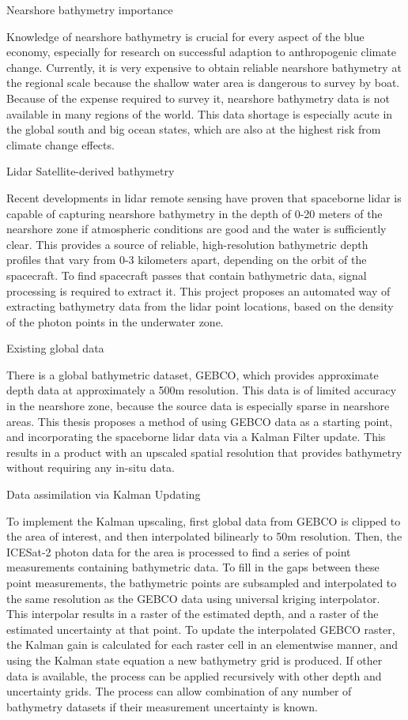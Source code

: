 Nearshore bathymetry importance

Knowledge of nearshore bathymetry is crucial for every aspect of the blue economy, especially for research on successful adaption to anthropogenic climate change. Currently, it is very expensive to obtain reliable nearshore bathymetry at the regional scale because the shallow water area is dangerous to survey by boat. Because of the expense required to survey it, nearshore bathymetry data is not available  in many regions of the world. This data shortage is especially acute in the global south and big ocean states, which are also at the highest risk from climate change effects. 

Lidar Satellite-derived bathymetry

Recent developments in lidar remote sensing have proven that spaceborne lidar is capable of capturing nearshore bathymetry in the depth of 0-20 meters of the nearshore zone if  atmospheric conditions are good and the water is sufficiently clear. This provides a source of reliable, high-resolution bathymetric depth profiles that vary from 0-3 kilometers apart, depending on the orbit of the spacecraft. To find spacecraft passes that contain bathymetric data, signal processing is required to extract it. This project proposes an automated way of extracting bathymetry data from the lidar point locations, based on the density of the photon points in the underwater zone.

Existing global data

There is a global bathymetric dataset, GEBCO, which provides approximate depth data at approximately a 500m resolution. This data is of limited accuracy in the nearshore zone, because the source data is especially sparse in nearshore areas. This thesis proposes a method of using GEBCO data as a starting point, and incorporating the spaceborne lidar data via a Kalman Filter update. This results in a product with an upscaled spatial resolution that provides bathymetry without requiring any in-situ data.

Data assimilation via Kalman Updating

To implement the Kalman upscaling, first global data from GEBCO is clipped to the area of interest, and then interpolated bilinearly to 50m resolution. Then, the ICESat-2 photon data for the area is processed to find a series of point measurements containing bathymetric data. To fill in the gaps between these point measurements, the bathymetric points are subsampled and interpolated to the same resolution as the GEBCO data using universal kriging interpolator. This interpolar results in a raster of the estimated depth, and a raster of the estimated uncertainty at that point. To update the interpolated GEBCO raster, the Kalman gain is calculated for each raster cell in an elementwise manner, and using the Kalman state equation a new bathymetry grid is produced. If other data is available, the process can be applied recursively with other depth and uncertainty grids. The process can allow combination of any number of bathymetry datasets if their measurement uncertainty is known. 

